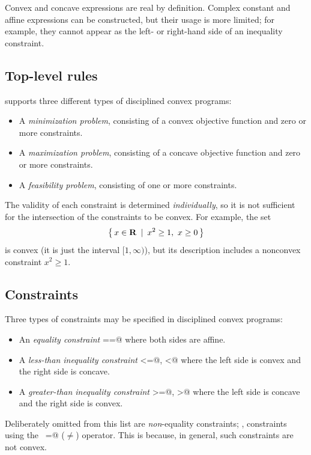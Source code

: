 \documentclass[12pt]{article}
\begin{document}
Convex and concave expressions are real by definition. Complex constant
and affine expressions can be constructed, but their usage is more limited;
for example, they cannot appear as the left- or right-hand side of an inequality
constraint.

\subsection{Top-level rules}
\label{sec:toplevel}

\cvx supports three different types of disciplined convex programs:
\begin{itemize}
\item A \emph{minimization problem}, consisting of a convex objective function
and zero or more constraints.
\item A \emph{maximization problem}, consisting of a concave objective function
and zero or more constraints.
\item A \emph{feasibility problem}, consisting of one or more constraints.
\end{itemize}
The validity of each constraint is determined \emph{individually}, so it is not
sufficient for the intersection of the constraints to be convex. For example, the set
\begin{equation*}
	\Condset{ x\in \R }{ x^2 \geq 1, ~ x \geq 0 }
\end{equation*}
is convex (it is just the interval $[1,\infty)$), but its description
includes a nonconvex constraint $x^2 \geq 1$.

\subsection{Constraints}

Three types of constraints may be specified in disciplined convex programs:
\begin{itemize}
\item An \emph{equality constraint} \verb@==@ where both sides are affine.
\item A \emph{less-than inequality constraint} \verb@<=@, \verb@<@ 
where the left side is convex and the right side is concave.
\item A \emph{greater-than inequality constraint} \verb@>=@, \verb@>@ 
where the left side is concave and the right side is convex.
\end{itemize}
Deliberately omitted from this list are \emph{non}-equality constraints; \ie,
constraints using the \verb@~=@ ($\neq$) operator. This is because, in general,
such constraints are not convex.
\end{document}
